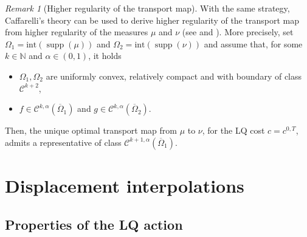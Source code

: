 \documentclass[reqno]{amsart}
\DeclareMathOperator{\supp}{supp}
\theoremstyle{plain}
\theoremstyle{definition}
\theoremstyle{remark}
\newtheorem{rem}[thm]{Remark}
\begin{document}
		\begin{rem}[Higher regularity of the transport map]\label{rmk:highereg}
			 With the same strategy, Caffarelli's theory can be used to derive higher regularity of the transport map from higher regularity of the measures $\mu$ and $\nu$ (see \cite[Theorem 12.50]{Villanioldandnew} and \cite{CaffarelliRegConvMaps}). More precisely, set $\Omega_1=\mathrm{int}(\supp(\mu))$ and $\Omega_2=\mathrm{int}(\supp(\nu))$ and assume that, for some $k\in\mathbb{N}$ and $\alpha\in(0,1)$, it holds
             \begin{itemize}
                 \item $\Omega_1,\Omega_2$ are uniformly convex, relatively compact and with boundary of class $\mathcal{C}^{k+2}$,
                 \item $f\in\mathcal{C}^{k,\alpha}(\overline{\Omega}_1)$ and $g\in\mathcal{C}^{k,\alpha}(\overline{\Omega}_2)$.
             \end{itemize}
             Then, the unique optimal transport map from $\mu$ to $\nu$, for the LQ cost $c=c^{0,T}$, admits a representative of class $\mathcal{C}^{k+1,\alpha}(\overline{\Omega}_1)$. 
		\end{rem}
        
    \section{Displacement interpolations}\label{representation_theorem}
    \subsection{Properties of the LQ action}
  
\end{document}
